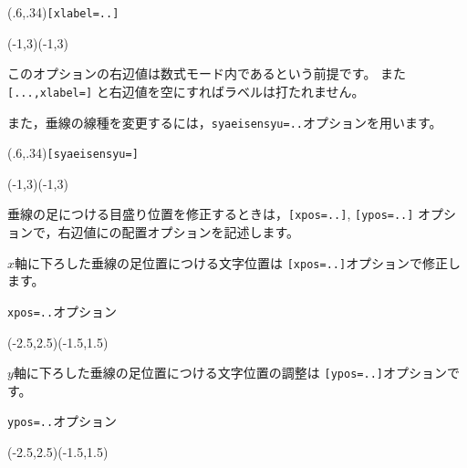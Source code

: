 \begin{showEx}(.6,.34){\texttt{[xlabel=..]}}
\footnotesize
\begin{zahyou}(-1,3)(-1,3)
  \Put\A[syaei=xy,xlabel=\frac32,
    ylabel=\sqrt2]{}
\end{zahyou}
\end{showEx}

このオプションの右辺値は数式モード内であるという前提です。
また \verb/[...,xlabel=]/ と右辺値を空にすればラベルは打たれません。

また，垂線の線種を変更するには，\verb+syaeisensyu=..+オプションを用います。

\begin{showEx}(.6,.34){\texttt{[syaeisensyu=]}}
\footnotesize
\begin{zahyou}(-1,3)(-1,3)
  \Put\A[syaei=x,%
    syaeisensyu=\protect\dottedline{.1}]{}
\end{zahyou}
\end{showEx}

垂線の足につける目盛り位置を修正するときは，\verb+[xpos=..]+, \verb+[ypos=..]+
オプションで，右辺値にの配置オプションを記述します。

$x$軸に下ろした垂線の足位置につける文字位置は
\verb+[xpos=..]+オプションで修正します。

\begin{showEx}{\texttt{xpos=..}オプション}
\begin{zahyou}[ul=10mm]%
    (-2.5,2.5)(-1.5,1.5)
  \Put\A[syaei=xy,xpos={[ne]}]{}
  \Put\B[syaei=xy,%
    xpos={(-2pt,-2pt)[rt]}]{}
\end{zahyou}
\end{showEx}

$y$軸に下ろした垂線の足位置につける文字位置の調整は
\verb+[ypos=..]+オプションです。

\begin{showEx}{\texttt{ypos=..}オプション}
\begin{zahyou}[ul=10mm]%
    (-2.5,2.5)(-1.5,1.5)
  \Put\A[syaei=xy,ypos={[ne]}]{}
  \Put\B[syaei=xy,%
    ypos={(-2pt,-2pt)[rt]}]{}
\end{zahyou}
\end{showEx}
